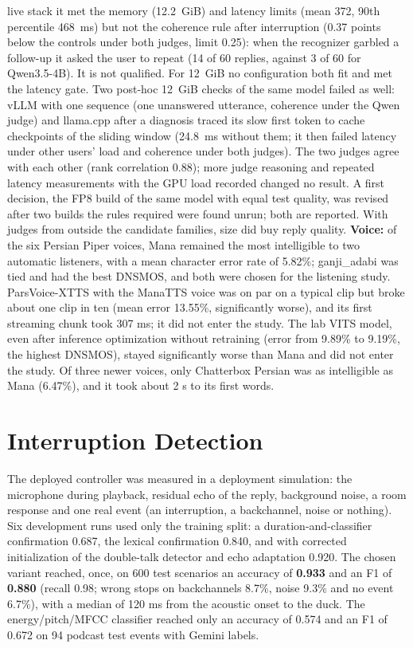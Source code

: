 live stack it met the memory (12.2~GiB) and latency limits (mean 372, 90th percentile
468~ms) but not the coherence rule after interruption (0.37 points below the controls
under both judges, limit 0.25): when the recognizer garbled a follow-up it asked the user
to repeat (14 of 60 replies, against 3 of 60 for Qwen3.5-4B). It is not qualified. For
12~GiB no configuration both fit and met the latency gate. Two post-hoc 12~GiB checks of
the same model failed as well: vLLM with one sequence (one unanswered utterance, coherence
under the Qwen judge) and llama.cpp after a diagnosis traced its slow first token to cache
checkpoints of the sliding window (24.8~ms without them; it then failed latency under
other users' load and coherence under both judges). The two judges agree
with each other (rank correlation 0.88); more judge reasoning and repeated latency
measurements with the GPU load recorded changed no result. A first decision, the FP8
build of the same model with equal test quality, was revised after two builds the
rules required were found unrun; both are reported. With judges from outside the
candidate families, size did buy reply quality. \textbf{Voice:} of the six Persian Piper voices,
Mana remained the most intelligible to two automatic listeners, with a mean
character error rate of 5.82\%; ganji\_adabi was tied and had the best DNSMOS, and
both were chosen for the listening study. ParsVoice-XTTS with the ManaTTS voice was on par
on a typical clip but broke about one clip in ten (mean error 13.55\%,
significantly worse), and its first streaming chunk took 307 ms; it did not enter
the study. The lab VITS model, even after inference optimization without
retraining (error from 9.89\% to 9.19\%, the highest DNSMOS), stayed significantly
worse than Mana and did not enter the study. Of three newer voices, only Chatterbox
Persian was as intelligible as Mana (6.47\%), and it took about 2 s to its first words.

\section{Interruption Detection}
\label{sec:res-bargein}

The deployed controller was measured in a deployment simulation: the microphone
during playback, residual echo of the reply, background noise, a room response
and one real event (an interruption, a backchannel, noise or nothing). Six
development runs used only the training split: a duration-and-classifier
confirmation 0.687, the lexical confirmation 0.840, and with corrected
initialization of the double-talk detector and echo adaptation 0.920. The chosen
variant reached, once, on 600 test scenarios an accuracy of \textbf{0.933} and an
F1 of \textbf{0.880} (recall 0.98; wrong stops on backchannels 8.7\%, noise
9.3\% and no event 6.7\%), with a median of 120 ms from the acoustic onset to the
duck. The energy/pitch/MFCC classifier reached only an accuracy of 0.574 and an
F1 of 0.672 on 94 podcast test events with Gemini labels.

